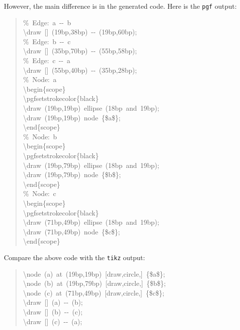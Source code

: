 \documentclass[10pt,a4paper,english]{article}
\begin{document}
However, the main difference is in the generated code. Here is the \texttt{pgf} output:
\begin{quote}{\ttfamily \raggedright \noindent
{\%}~Edge:~a~-{}-~b~\\
{\textbackslash}draw~{[}{]}~(19bp,38bp)~-{}-~(19bp,60bp);~\\
{\%}~Edge:~b~-{}-~c~\\
{\textbackslash}draw~{[}{]}~(35bp,70bp)~-{}-~(55bp,58bp);~\\
{\%}~Edge:~c~-{}-~a~\\
{\textbackslash}draw~{[}{]}~(55bp,40bp)~-{}-~(35bp,28bp);~\\
{\%}~Node:~a~\\
{\textbackslash}begin{\{}scope{\}}~\\
{\textbackslash}pgfsetstrokecolor{\{}black{\}}~\\
{\textbackslash}draw~(19bp,19bp)~ellipse~(18bp~and~19bp);~\\
{\textbackslash}draw~(19bp,19bp)~node~{\{}{\$}a{\$}{\}};~\\
{\textbackslash}end{\{}scope{\}}~\\
{\%}~Node:~b~\\
{\textbackslash}begin{\{}scope{\}}~\\
{\textbackslash}pgfsetstrokecolor{\{}black{\}}~\\
{\textbackslash}draw~(19bp,79bp)~ellipse~(18bp~and~19bp);~\\
{\textbackslash}draw~(19bp,79bp)~node~{\{}{\$}b{\$}{\}};~\\
{\textbackslash}end{\{}scope{\}}~\\
{\%}~Node:~c~\\
{\textbackslash}begin{\{}scope{\}}~\\
{\textbackslash}pgfsetstrokecolor{\{}black{\}}~\\
{\textbackslash}draw~(71bp,49bp)~ellipse~(18bp~and~19bp);~\\
{\textbackslash}draw~(71bp,49bp)~node~{\{}{\$}c{\$}{\}};~\\
{\textbackslash}end{\{}scope{\}}
}\end{quote}

Compare the above code with the \texttt{tikz} output:
\begin{quote}{\ttfamily \raggedright \noindent
{\textbackslash}node~(a)~at~(19bp,19bp)~{[}draw,circle,{]}~{\{}{\$}a{\$}{\}};~\\
{\textbackslash}node~(b)~at~(19bp,79bp)~{[}draw,circle,{]}~{\{}{\$}b{\$}{\}};~\\
{\textbackslash}node~(c)~at~(71bp,49bp)~{[}draw,circle,{]}~{\{}{\$}c{\$}{\}};~\\
{\textbackslash}draw~{[}{]}~(a)~-{}-~(b);~\\
{\textbackslash}draw~{[}{]}~(b)~-{}-~(c);~\\
{\textbackslash}draw~{[}{]}~(c)~-{}-~(a);
}\end{quote}
\end{document}
